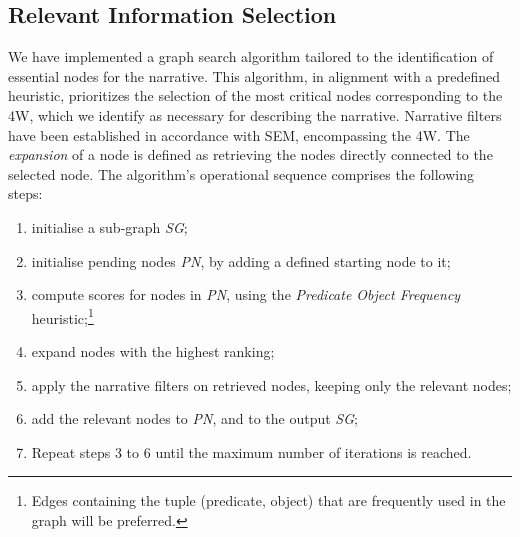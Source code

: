 \documentclass[
hf, %
]{ceurart}
\begin{document}
\subsection{Relevant Information Selection}
We have implemented a graph search algorithm tailored to the identification of essential nodes for the narrative. This algorithm, in alignment with a predefined heuristic, prioritizes the selection of the most critical nodes corresponding to the 4W, which we identify as necessary for describing the narrative. Narrative filters have been established in accordance with SEM, encompassing the 4W.
The \textit{expansion} of a node is defined as retrieving the nodes directly connected to the selected node. The algorithm's operational sequence comprises the following steps:
\begin{enumerate}
 \item initialise a sub-graph \textit{SG};
 \item initialise pending nodes \textit{PN}, by adding a defined starting node to it;
 \item compute scores for nodes in \textit{PN}, using the \textit{Predicate Object Frequency} heuristic;\footnote{Edges containing the tuple (predicate, object) that are frequently used in the graph will be preferred.}
 \item expand nodes with the highest ranking; %
 \item apply the narrative filters on retrieved nodes, keeping only the relevant nodes;
 \item add the relevant nodes to \textit{PN}, and to the output \textit{SG};
 \item Repeat steps 3 to 6 until the maximum number of iterations is reached.
\end{enumerate}

\end{document}
